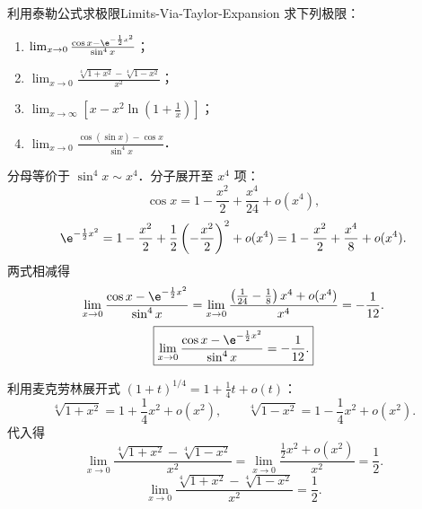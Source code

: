 \begin{problem}{利用泰勒公式求极限}{Limits-Via-Taylor-Expansion}
    求下列极限：
    \begin{enumerate}
        \item $\lim_{x\to 0} \frac{\cos x - \e^{-\frac{1}{2}x^2}}{\sin^4 x}$；
        \item $\lim_{x\to 0} \frac{\sqrt[4]{1+x^2} - \sqrt[4]{1-x^2}}{x^2}$；
        \item $\lim_{x\to\infty} \left[ x - x^2 \ln\left(1 + \frac{1}{x}\right) \right]$；
        \item $\lim_{x\to 0} \frac{\cos(\sin x) - \cos x}{\sin^4 x}$．
    \end{enumerate}
\end{problem}

\begin{solution}

    分母等价于 $\sin^4 x \sim x^4$．分子展开至 $x^4$ 项：
    \begin{equation}
        \cos x = 1 - \frac{x^2}{2} + \frac{x^4}{24} + o(x^4),
    \end{equation}
    \begin{equation}
        \e^{-\frac{1}{2}x^2} = 1 - \frac{x^2}{2} + \frac{1}{2}\left( -\frac{x^2}{2} \right)^2 + o(x^4) = 1 - \frac{x^2}{2} + \frac{x^4}{8} + o(x^4).
    \end{equation}
    两式相减得
    \begin{equation}
        \lim_{x\to 0} \frac{\cos x - \e^{-\frac{1}{2}x^2}}{\sin^4 x} = \lim_{x\to 0} \frac{\left( \frac{1}{24} - \frac{1}{8} \right)x^4 + o(x^4)}{x^4} = -\frac{1}{12}.
    \end{equation}
    \begin{equation}
        \boxed{\lim_{x\to 0} \frac{\cos x - \e^{-\frac{1}{2}x^2}}{\sin^4 x} = -\frac{1}{12}.}
    \end{equation}


    利用麦克劳林展开式 $(1+t)^{1/4} = 1 + \frac{1}{4}t + o(t)$：
    \begin{equation}
        \sqrt[4]{1+x^2} = 1 + \frac{1}{4}x^2 + o(x^2), \qquad \sqrt[4]{1-x^2} = 1 - \frac{1}{4}x^2 + o(x^2).
    \end{equation}
    代入得
    \begin{equation}
        \lim_{x\to 0} \frac{\sqrt[4]{1+x^2} - \sqrt[4]{1-x^2}}{x^2} = \lim_{x\to 0} \frac{\frac{1}{2}x^2 + o(x^2)}{x^2} = \frac{1}{2}.
    \end{equation}
    \begin{equation}
        \boxed{\lim_{x\to 0} \frac{\sqrt[4]{1+x^2} - \sqrt[4]{1-x^2}}{x^2} = \frac{1}{2}.}
    \end{equation}


\end{solution}
